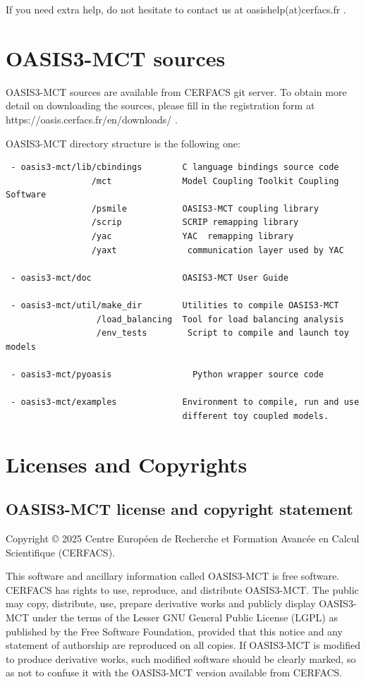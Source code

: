 If you need extra help, do not hesitate to contact us at
oasishelp(at)cerfacs.fr .

\section{OASIS3-MCT sources}
\label{sec_Obtaining}
OASIS3-MCT sources are available from CERFACS git server. To obtain more detail on downloading
the sources, please fill in the registration form at https://oasis.cerfacs.fr/en/downloads/ .

OASIS3-MCT directory structure is the following one:

\begin{verbatim}
 - oasis3-mct/lib/cbindings        C language bindings source code
                 /mct              Model Coupling Toolkit Coupling Software
                 /psmile           OASIS3-MCT coupling library
                 /scrip            SCRIP remapping library  
                 /yac              YAC  remapping library 
                 /yaxt	            communication layer used by YAC            

 - oasis3-mct/doc                  OASIS3-MCT User Guide

 - oasis3-mct/util/make_dir        Utilities to compile OASIS3-MCT
                  /load_balancing  Tool for load balancing analysis
                  /env_tests        Script to compile and launch toy models          
                  
 - oasis3-mct/pyoasis	             Python wrapper source code

 - oasis3-mct/examples             Environment to compile, run and use
                                   different toy coupled models. 
\end{verbatim}
\newpage
\section{Licenses and Copyrights}
 
\subsection{OASIS3-MCT license and copyright statement}

Copyright © 2025 Centre Europ\'een de Recherche et Formation
Avanc\'ee en Calcul Scientifique (CERFACS).  

This software and ancillary information called OASIS3-MCT is free
software.  CERFACS has rights to use, reproduce, and distribute
OASIS3-MCT. The public may copy, distribute, use, prepare derivative works and
publicly display OASIS3-MCT under the terms of the Lesser GNU General
Public License (LGPL) as published by the Free Software Foundation,
provided that this notice and any statement of authorship are
reproduced on all copies. If OASIS3-MCT is modified to produce derivative
works, such modified software should be clearly marked, so as not to
confuse it with the OASIS3-MCT version available from CERFACS.

